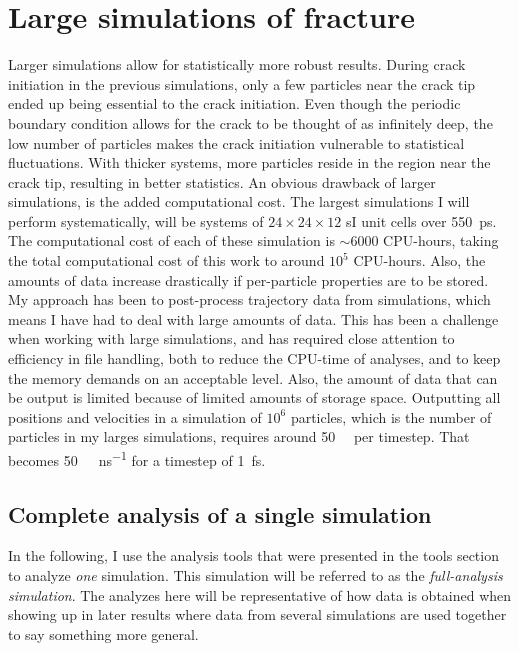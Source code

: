 \section{Large simulations of fracture}
Larger simulations allow for statistically more robust results. During crack initiation in the previous simulations, only a few particles near the crack tip ended up being essential to the crack initiation. Even though the periodic boundary condition allows for the crack to be thought of as infinitely deep, the low number of particles makes the crack initiation vulnerable to statistical fluctuations. With thicker systems, more particles reside in the region near the crack tip, resulting in better statistics. An obvious drawback of larger simulations, is the added computational cost. The largest simulations I will perform systematically, will be systems of $24\times 24\times 12$ sI unit cells over \SI{550}{\pico\second}. The computational cost of each of these simulation is $\sim 6000$ CPU-hours, taking the total computational cost of this work to around $10^5$ CPU-hours. Also, the amounts of data increase drastically if per-particle properties are to be stored. My approach has been to post-process trajectory data from simulations, which means I have had to deal with large amounts of data. This has been a challenge when working with large simulations, and has required close attention to efficiency in file handling, both to reduce the CPU-time of analyses, and to keep the memory demands on an acceptable level. Also, the amount of data that can be output is limited because of limited amounts of storage space. Outputting all positions and velocities in a simulation of $10^6$ particles, which is the number of particles in my larges simulations, requires around \SI{50}{\mega\byte} per timestep. That becomes \SI{50}{\tera\byte\per\nano\second} for a timestep of \SI{1}{\femto\second}. 

\label{sec:complete_analysis_single_simulation}

\subsection{Complete analysis of a single simulation}
In the following, I use the analysis tools that were presented in the tools section to analyze \emph{one} simulation. This simulation will be referred to as the \emph{full-analysis simulation}. The analyzes here will be representative of how data is obtained when showing up in later results where data from several simulations are used together to say something more general. 

